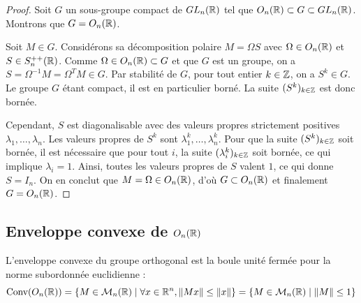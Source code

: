 \lvspace \avspace {}
\begin{proof}
    Soit $G$ un sous-groupe compact de $GL_n(\mathbb{R})$ tel que $O_n(\mathbb{R}) \subset G \subset GL_n(\mathbb{R})$. Montrons que $G = O_n(\mathbb{R})$.
    
    Soit $M \in G$. Considérons sa décomposition polaire $M = \Omega S$ avec $\Omega \in O_n(\mathbb{R})$ et $S \in S_n^{++}(\mathbb{R})$.
    Comme $\Omega \in O_n(\mathbb{R}) \subset G$ et que $G$ est un groupe, on a $S = \Omega^{-1} M = \Omega^T M \in G$.
    Par stabilité de $G$, pour tout entier $k \in \mathbb{Z}$, on a $S^k \in G$.
    Le groupe $G$ étant compact, il est en particulier borné. La suite $(S^k)_{k \in \mathbb{Z}}$ est donc bornée.
    
    Cependant, $S$ est diagonalisable avec des valeurs propres strictement positives $\lambda_1, \dots, \lambda_n$.
    Les valeurs propres de $S^k$ sont $\lambda_1^k, \dots, \lambda_n^k$.
    Pour que la suite $(S^k)_{k \in \mathbb{Z}}$ soit bornée, il est nécessaire que pour tout $i$, la suite $(\lambda_i^k)_{k \in \mathbb{Z}}$ soit bornée, ce qui implique $\lambda_i = 1$.
    Ainsi, toutes les valeurs propres de $S$ valent $1$, ce qui donne $S = I_n$.
    On en conclut que $M = \Omega \in O_n(\mathbb{R})$, d'où $G \subset O_n(\mathbb{R})$ et finalement $G = O_n(\mathbb{R})$.
\end{proof}

\subsection{Enveloppe convexe de \texorpdfstring{$O_n(\mathbb{R})$}{On(R)}}

\begin{corollaire}{}{}
    L'enveloppe convexe du groupe orthogonal est la boule unité fermée pour la norme subordonnée euclidienne :
    \[ \text{Conv}(O_n(\mathbb{R})) = \left\{ M \in \mathcal{M}_n(\mathbb{R}) \mid \forall x \in \mathbb{R}^n, \left\|Mx\right\| \le \left\|x\right\| \right\} = \left\{ M \in \mathcal{M}_n(\mathbb{R}) \mid \left\|M\right\| \le 1 \right\} \]
\end{corollaire}

